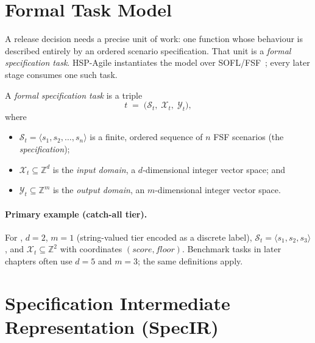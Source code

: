 \section{Formal Task Model}
\label{sec:form:task}

A release decision needs a precise unit of work: one function whose behaviour
is described entirely by an ordered scenario specification.
That unit is a \emph{formal specification task}.
HSP-Agile instantiates the model over SOFL/FSF~\citep{li2022qrs_companion,liu2004soflbook};
every later stage consumes one such task.

\begin{definition}
\label{def:task}
A \emph{formal specification task} is a triple
\[
  t \;=\; \bigl(\mathcal{S}_t,\;\mathcal{X}_t,\;\mathcal{Y}_t\bigr),
\]
where
\begin{itemize}
  \item $\mathcal{S}_t = \langle s_1, s_2, \ldots, s_n \rangle$ is a finite,
        ordered sequence of $n$ FSF scenarios (the \emph{specification});
  \item $\mathcal{X}_t \subseteq \mathbb{Z}^d$ is the \emph{input domain},
        a $d$-dimensional integer vector space; and
  \item $\mathcal{Y}_t \subseteq \mathbb{Z}^m$ is the \emph{output domain},
        an $m$-dimensional integer vector space.
\end{itemize}
\end{definition}

\paragraph{Primary example (catch-all tier).}
For , $d=2$, $m=1$ (string-valued tier encoded as a
discrete label), $\mathcal{S}_t=\langle s_1,s_2,s_3\rangle$, and
$\mathcal{X}_t\subseteq\mathbb{Z}^2$ with coordinates
$(\mathit{score},\mathit{floor})$.
Benchmark tasks in later chapters often use $d=5$ and $m=3$; the same
definitions apply.

\section{Specification Intermediate Representation (SpecIR)}
\label{sec:form:specir}

